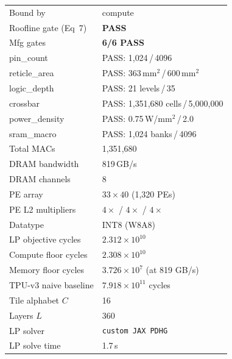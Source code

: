 \begin{table}[h]
\begin{tabular}{@{}ll@{}}
Bound by                & compute \\
Roofline gate (Eq~7)    & \textcolor{green!60!black}{\textbf{PASS}} \\
\midrule
Mfg gates               & \textcolor{green!60!black}{\textbf{6/6 PASS}} \\
\quad pin\_count         & PASS: 1{,}024\,/\,4096 \\
\quad reticle\_area      & PASS: 363\,mm$^2$\,/\,600\,mm$^2$ \\
\quad logic\_depth       & PASS: 21 levels\,/\,35 \\
\quad crossbar           & PASS: 1{,}351{,}680 cells\,/\,5{,}000{,}000 \\
\quad power\_density     & PASS: 0.75\,W/mm$^2$\,/\,2.0 \\
\quad sram\_macro        & PASS: 1{,}024 banks\,/\,4096 \\
\midrule
Total MACs              & 1{,}351{,}680 \\
DRAM bandwidth          & 819\,GB/s \\
DRAM channels           & 8 \\
PE array                & $33 \times 40$ (1{,}320 PEs) \\
PE L2 multipliers       & $4\times$ / $4\times$ / $4\times$ \\
Datatype                & INT8 (W8A8) \\
LP objective cycles     & $2.312 \times 10^{10}$ \\
Compute floor cycles    & $2.308 \times 10^{10}$ \\
Memory floor cycles     & $3.726 \times 10^{7}$ (at 819 GB/s) \\
TPU-v3 naive baseline   & $7.918 \times 10^{11}$ cycles \\
Tile alphabet $C$       & 16 \\
Layers $L$              & 360 \\
LP solver               & \texttt{custom JAX PDHG} \\
LP solve time           & 1.7\,s \\
\bottomrule
\end{tabular}
\end{table}


